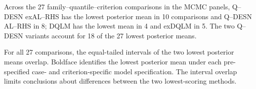 Across the 27 family--quantile--criterion comparisons in the MCMC panels, Q--DESN exAL--RHS has the lowest posterior mean in 10 comparisons and Q--DESN AL--RHS in 8; DQLM has the lowest mean in 4 and exDQLM in 5. The two Q--DESN variants account for 18 of the 27 lowest posterior means.

For all 27 comparisons, the equal-tailed intervals of the two lowest posterior means overlap. Boldface identifies the lowest posterior mean under each pre-specified case- and criterion-specific model specification. The interval overlap limits conclusions about differences between the two lowest-scoring methods.
